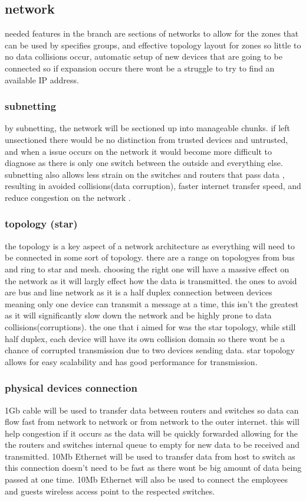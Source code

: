 \documentclass[11pt]{article}
\begin{document}
\subsection{network}
needed features in the branch are sections of networks to allow for the zones that can be used by specifies groups, and effective topology layout for zones so little to no data collisions occur, automatic setup of new devices that are going to be connected so if expansion occurs there wont be a struggle to try to find an available IP address. 

\subsubsection{subnetting}
by subnetting, the network will be sectioned up into manageable chunks. if left unsectioned there would be no distinction from trusted devices and untrusted, and when a issue occurs on the network it would become more difficult to diagnose as there is only one switch between the outside and everything else. subnetting also allows less strain on the switches and routers that pass data , resulting in avoided collisions(data corruption), faster internet transfer speed, and reduce congestion on the network \cite{mogul1985internet}.

\subsubsection{topology (star)}
the topology is a key aspect of a network architecture as everything will need to be connected in some sort of topology. there are a range on topologyes from bus and ring to star and mesh. choosing the right one will have a massive effect on the network as it will largly effect how the data is transmitted. the ones to avoid are bus and line network as it is a half duplex connection between devices meaning only one device can transmit a message at a time, this isn't the greatest as it will significantly slow down the network and be highly prone to data collisions(corruptions). the one that i aimed for was the star topology, while still half duplex, each device will have its own collision domain so there wont be a chance of corrupted transmission due to two devices sending data. star topology allows for easy scalability and has good performance for transmission\cite{bisht2015analytical}.

\subsubsection{physical devices connection}
1Gb cable will be used to transfer data between routers and switches so data can flow fast from network to network or from network to the outer internet. this will help congestion if it occurs as the data will be quickly forwarded allowing for the the routers and switches internal queue to empty for new data to be received and transmitted. 10Mb Ethernet will be used to transfer data from host to switch as this connection doesn't need to be fast as there wont be big amount of data being passed at one time. 10Mb Ethernet will also be used to connect the employees and guests wireless access point to the respected switches.
\end{document}
